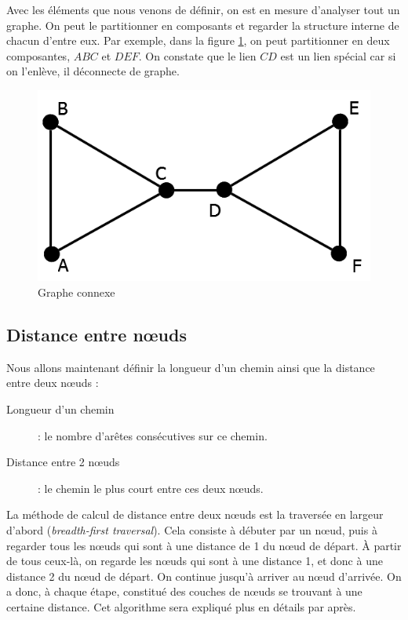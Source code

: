 Avec les éléments que nous venons de définir, on est en mesure d'analyser tout un graphe. On peut le partitionner en composants et regarder la structure interne de chacun d'entre eux. Par exemple, dans la figure \ref{gr_connexe}, on peut partitionner en deux composantes, $ABC$ et $DEF$. On constate que le lien $CD$ est un lien spécial car si on l'enlève, il déconnecte de graphe.\\
	\begin{figure}
	\center
	\includegraphics[scale=0.3]{images/18_gr_connexe.png}
	\caption{\label{gr_connexe} Graphe connexe}
	\end{figure}

\subsection{Distance entre n\oe uds}
Nous allons maintenant définir la longueur d'un chemin ainsi que la distance entre deux n\oe uds :
\begin{description}
\item[Longueur d'un chemin] : le nombre d'arêtes consécutives sur ce chemin.
\item [Distance entre 2 n\oe uds] : le chemin le plus court entre ces deux n\oe uds.
\end{description}

La méthode de calcul de distance entre deux n\oe uds est la traversée en largeur d'abord (\emph{breadth-first traversal}). Cela consiste à débuter par un n\oe ud, puis à regarder tous les n\oe uds qui sont à une distance de 1 du n\oe ud de départ. À partir de tous ceux-là, on regarde les n\oe uds qui sont à une distance 1, et donc à une distance 2 du n\oe ud de départ. On continue jusqu'à arriver au n\oe ud d'arrivée. On a donc, à chaque étape, constitué des couches de n\oe uds se trouvant à une certaine distance. Cet algorithme sera expliqué plus en détails par après.\\

